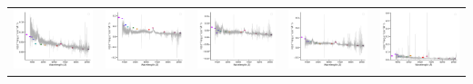 \begin{center}
\begin{longtable}{l l l l l }
    \includegraphics[width=0.2\linewidth, clip]{Figs/Figs-sdss/spec-0701-52179-0153-STRIPE82-0045-050333.pdf} & \includegraphics[width=0.2\linewidth, clip]{Figs/Figs-sdss/spec-0702-52178-0098-STRIPE82-0047-013896.pdf} & \includegraphics[width=0.2\linewidth, clip]{Figs/Figs-sdss/spec-0702-52178-0126-STRIPE82-0047-015137.pdf} & \includegraphics[width=0.2\linewidth, clip]{Figs/Figs-sdss/spec-0703-52209-0097-STRIPE82-0049-015869.pdf} & \includegraphics[width=0.2\linewidth, clip]{Figs/Figs-sdss/spec-0707-52177-0374-STRIPE82-0060-019709.pdf} \\

\end{longtable}
\end{center}
